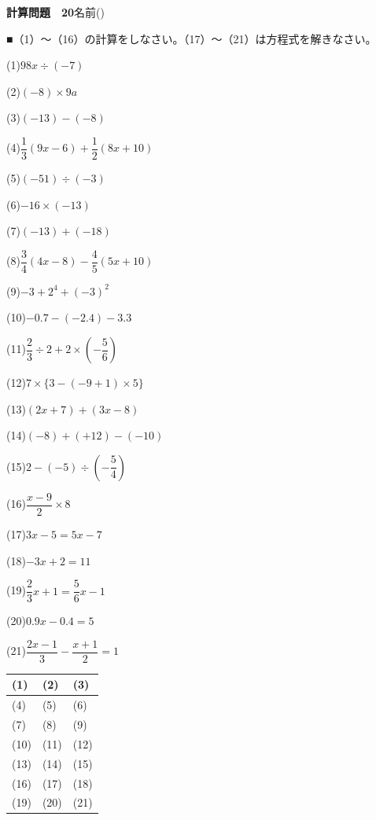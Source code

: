 \documentclass[a4paper,11pt]{ltjsarticle}
\newlength{\qcol}\setlength{\qcol}{0.47\textwidth}
\newlength{\qgap}
\newlength{\anscolw}\setlength{\anscolw}{0.30\textwidth}
\newlength{\ansh}
\newcommand{\Q}[2]{\parbox[t]{\qcol}{\raggedright (#1)\hspace{0.6em}$\displaystyle #2$}}
\newcommand{\QR}[4]{\Q{#1}{#2}\hfill\Q{#3}{#4}\par\vspace{\qgap}}
\newcommand{\anscell}[1]{\rule[-\ansdrop]{0pt}{\ansh}(#1)}
\newlength{\ansdrop}
\begin{document}
{\large\bfseries 計算問題　20}\hfill 名前(\underline{\hspace{32mm}})\par\vspace{3mm}
■（1）〜（16）の計算をしなさい。（17）〜（21）は方程式を解きなさい。\par\vspace{3mm}
\setlength{\qgap}{5.4mm}
\QR{1}{98x\div(-7)}{2}{(-8)\times9a}
\QR{3}{(-13)-(-8)}{4}{\dfrac{1}{3}(9x-6)+\dfrac{1}{2}(8x+10)}
\QR{5}{(-51)\div(-3)}{6}{-16\times(-13)}
\QR{7}{(-13)+(-18)}{8}{\dfrac{3}{4}(4x-8)-\dfrac{4}{5}(5x+10)}
\QR{9}{-3+2^4+(-3)^2}{10}{-0.7-(-2.4)-3.3}
\QR{11}{\dfrac{2}{3}\div2+2\times\left(-\dfrac{5}{6}\right)}{12}{7\times\{3-(-9+1)\times5\}}
\QR{13}{(2x+7)+(3x-8)}{14}{(-8)+(+12)-(-10)}
\QR{15}{2-(-5)\div\left(-\dfrac{5}{4}\right)}{16}{\dfrac{x-9}{2}\times8}
\QR{17}{3x-5=5x-7}{18}{-3x+2=11}
\QR{19}{\dfrac{2}{3}x+1=\dfrac{5}{6}x-1}{20}{0.9x-0.4=5}
\vspace{1mm}
\Q{21}{\dfrac{2x-1}{3}-\dfrac{x+1}{2}=1}\par\vspace{3mm}
\setlength{\ansh}{9.5mm}\setlength{\ansdrop}{6mm}%
\begin{center}\begin{tabular}{|p{\anscolw}|p{\anscolw}|p{\anscolw}|}\hline
\anscell{1} & \anscell{2} & \anscell{3} \\\hline
\anscell{4} & \anscell{5} & \anscell{6} \\\hline
\anscell{7} & \anscell{8} & \anscell{9} \\\hline
\anscell{10} & \anscell{11} & \anscell{12} \\\hline
\anscell{13} & \anscell{14} & \anscell{15} \\\hline
\anscell{16} & \anscell{17} & \anscell{18} \\\hline
\anscell{19} & \anscell{20} & \anscell{21} \\\hline
\end{tabular}\end{center}
\end{document}
